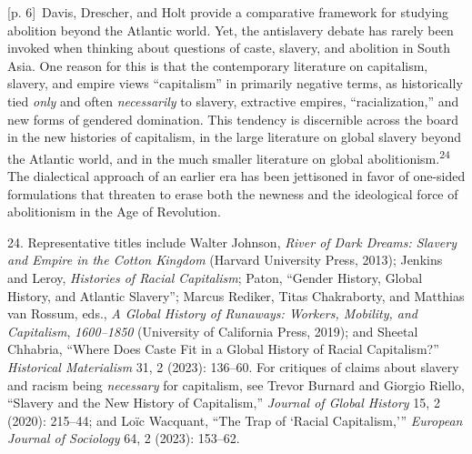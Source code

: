 \documentclass[10pt,a4paper]{article}
\begin{document}
{\scriptsize\color{gray} [p. 6]}\ Davis, Drescher, and Holt provide a comparative framework for studying abolition beyond the Atlantic world. Yet, the antislavery debate has rarely been invoked when thinking about questions of caste, slavery, and abolition in South Asia. One reason for this is that the contemporary literature on capitalism, slavery, and empire views “capitalism” in primarily negative terms, as historically tied \textit{only} and often \textit{necessarily} to slavery, extractive empires, “racialization,” and new forms of gendered domination. This tendency is discernible across the board in the new histories of capitalism, in the large literature on global slavery beyond the Atlantic world, and in the much smaller literature on global abolitionism.\nobreak\textsuperscript{24} The dialectical approach of an earlier era has been jettisoned in favor of one-sided formulations that threaten to erase both the newness and the ideological force of abolitionism in the Age of Revolution.\par{\small 24. Representative titles include Walter Johnson, \textit{River of Dark Dreams: Slavery and Empire in the Cotton Kingdom} (Harvard University Press, 2013); Jenkins and Leroy, \textit{Histories of Racial Capitalism}; Paton, “Gender History, Global History, and Atlantic Slavery”; Marcus Rediker, Titas Chakraborty, and Matthias van Rossum, eds., \textit{A Global History of Runaways: Workers, Mobility, and Capitalism}, \textit{1600–1850} (University of California Press, 2019); and Sheetal Chhabria, “Where Does Caste Fit in a Global History of Racial Capitalism?” \textit{Historical Materialism} 31, 2 (2023): 136–60. For critiques of claims about slavery and racism being \textit{necessary} for capitalism, see Trevor Burnard and Giorgio Riello, “Slavery and the New History of Capitalism,” \textit{Journal of Global History} 15, 2 (2020): 215–44; and Loïc Wacquant, “The Trap of ‘Racial Capitalism,’” \textit{European Journal of Sociology} 64, 2 (2023): 153–62.\par}
\end{document}
